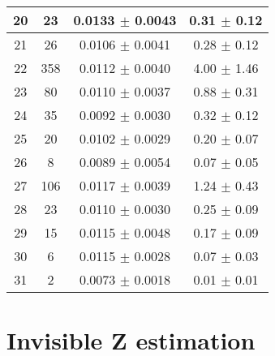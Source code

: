 \begin{table}
\begin{tabular}{c|c|c|c}
20 & 23  & 0.0133  $\pm$  0.0043  & 0.31 $\pm$ 0.12    \\\hline
21 & 26  & 0.0106  $\pm$  0.0041  & 0.28 $\pm$ 0.12    \\\hline
22 & 358  & 0.0112  $\pm$  0.0040  & 4.00 $\pm$ 1.46    \\\hline
23 & 80  & 0.0110  $\pm$  0.0037  & 0.88 $\pm$ 0.31    \\\hline
24 & 35  & 0.0092  $\pm$  0.0030  & 0.32 $\pm$ 0.12    \\\hline
25 & 20  & 0.0102  $\pm$  0.0029  & 0.20 $\pm$ 0.07    \\\hline
26 & 8  & 0.0089  $\pm$  0.0054  & 0.07 $\pm$ 0.05    \\\hline
27 & 106  & 0.0117  $\pm$  0.0039  & 1.24 $\pm$ 0.43    \\\hline
28 & 23  & 0.0110  $\pm$  0.0030  & 0.25 $\pm$ 0.09    \\\hline
29 & 15  & 0.0115  $\pm$  0.0048  & 0.17 $\pm$ 0.09    \\\hline
30 & 6  & 0.0115  $\pm$  0.0028  & 0.07 $\pm$ 0.03    \\\hline
31 & 2  & 0.0073  $\pm$  0.0018  & 0.01 $\pm$ 0.01    \\\hline
\end{tabular}
\end{table}

\section{Invisible Z estimation}


